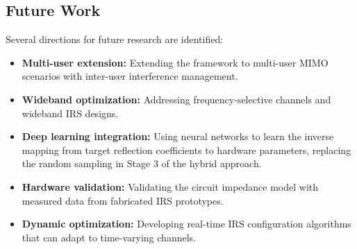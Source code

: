 \documentclass[12pt,a4paper]{article}
\begin{document}
\subsection{Future Work}

Several directions for future research are identified:
\begin{itemize}
    \item \textbf{Multi-user extension:} Extending the framework to multi-user MIMO scenarios with inter-user interference management.
    \item \textbf{Wideband optimization:} Addressing frequency-selective channels and wideband IRS designs.
    \item \textbf{Deep learning integration:} Using neural networks to learn the inverse mapping from target reflection coefficients to hardware parameters, replacing the random sampling in Stage 3 of the hybrid approach.
    \item \textbf{Hardware validation:} Validating the circuit impedance model with measured data from fabricated IRS prototypes.
    \item \textbf{Dynamic optimization:} Developing real-time IRS configuration algorithms that can adapt to time-varying channels.
\end{itemize}
\end{document}
